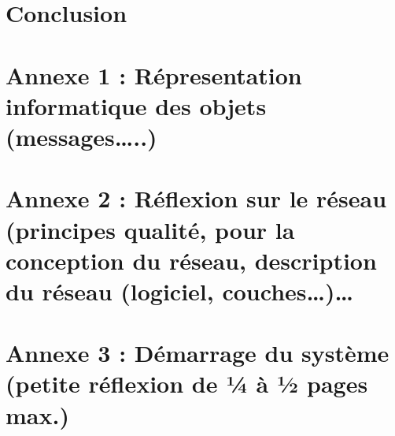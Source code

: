 \section{Conclusion}

\section{Annexe 1 : Répresentation informatique des objets (messages…..)}

\section{Annexe 2 : Réflexion sur le réseau (principes qualité, pour la conception du réseau,
description du réseau (logiciel, couches…)…}

\section{Annexe 3 : Démarrage du système (petite réflexion de ¼ à ½ pages max.)}
